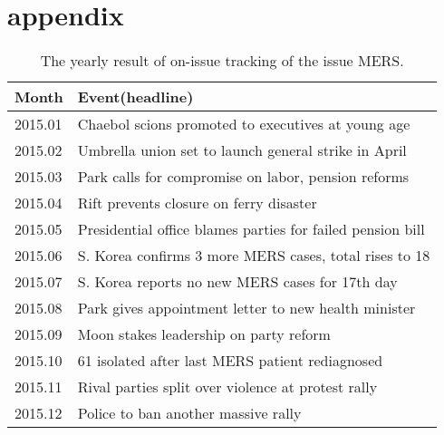 \section{appendix}
\begin{table}[!htbp]
  \begin{tabular}{l|l}
  Month   & Event(headline)                                        \\ \hline
  2015.01 & Chaebol scions promoted to executives at young age     \\
  2015.02 & Umbrella union set to launch general strike in April   \\
  2015.03 & Park calls for compromise on labor, pension reforms    \\
  2015.04 & Rift prevents closure on ferry disaster                \\
  2015.05 & Presidential office blames parties for failed pension bill \\
  2015.06 & S. Korea confirms 3 more MERS cases, total rises to 18 \\
  2015.07 & S. Korea reports no new MERS cases for 17th day        \\
  2015.08 & Park gives appointment letter to new health minister   \\
  2015.09 & Moon stakes leadership on party reform                 \\
  2015.10 & 61 isolated after last MERS patient rediagnosed        \\
  2015.11 & Rival parties split over violence at protest rally     \\
  2015.12 & Police to ban another massive rally                    \\
  \end{tabular}
  \caption{The yearly result of on-issue tracking of the issue MERS.}
\end{table}

